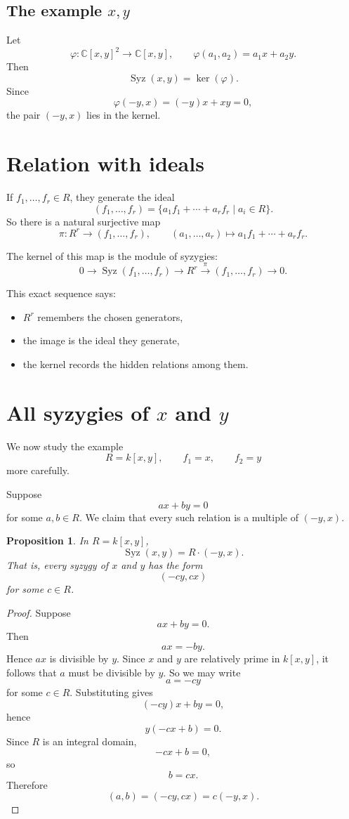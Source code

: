 \documentclass[11pt]{article}
\newtheorem{proposition}[theorem]{Proposition}
\theoremstyle{definition}
\theoremstyle{remark}
\newcommand{\C}{\mathbb{C}}
\newcommand{\Syz}{\operatorname{Syz}}
\newcommand{\kerR}{\operatorname{ker}}
\begin{document}
	\subsection{The example \(x,y\)}
	
	Let
	\[
	\varphi:\C[x,y]^2\to \C[x,y],
	\qquad
	\varphi(a_1,a_2)=a_1x+a_2y.
	\]
	Then
	\[
	\Syz(x,y)=\kerR(\varphi).
	\]
	Since
	\[
	\varphi(-y,x)=(-y)x+xy=0,
	\]
	the pair \((-y,x)\) lies in the kernel.
	
	\section{Relation with ideals}
	
	If \(f_1,\dots,f_r\in R\), they generate the ideal
	\[
	(f_1,\dots,f_r)
	=
	\{a_1f_1+\cdots+a_rf_r\mid a_i\in R\}.
	\]
	So there is a natural surjective map
	\[
	\pi:R^r\to (f_1,\dots,f_r),
	\qquad
	(a_1,\dots,a_r)\mapsto a_1f_1+\cdots+a_rf_r.
	\]
	
	The kernel of this map is the module of syzygies:
	\[
	0\to \Syz(f_1,\dots,f_r)\to R^r\xrightarrow{\pi}(f_1,\dots,f_r)\to 0.
	\]
	
	This exact sequence says:
	
	\begin{itemize}[leftmargin=2em]
		\item \(R^r\) remembers the chosen generators,
		\item the image is the ideal they generate,
		\item the kernel records the hidden relations among them.
	\end{itemize}
	
	\section{All syzygies of \(x\) and \(y\)}
	
	We now study the example
	\[
	R=k[x,y],\qquad f_1=x,\qquad f_2=y
	\]
	more carefully.
	
	Suppose
	\[
	ax+by=0
	\]
	for some \(a,b\in R\). We claim that every such relation is a multiple of \((-y,x)\).
	
	\begin{proposition}
		In \(R=k[x,y]\),
		\[
		\Syz(x,y)=R\cdot(-y,x).
		\]
		That is, every syzygy of \(x\) and \(y\) has the form
		\[
		(-cy,cx)
		\]
		for some \(c\in R\).
	\end{proposition}
	
	\begin{proof}
		Suppose
		\[
		ax+by=0.
		\]
		Then
		\[
		ax=-by.
		\]
		Hence \(ax\) is divisible by \(y\). Since \(x\) and \(y\) are relatively prime in \(k[x,y]\), it follows that \(a\) must be divisible by \(y\). So we may write
		\[
		a=-cy
		\]
		for some \(c\in R\). Substituting gives
		\[
		(-cy)x+by=0,
		\]
		hence
		\[
		y(-cx+b)=0.
		\]
		Since \(R\) is an integral domain,
		\[
		-cx+b=0,
		\]
		so
		\[
		b=cx.
		\]
		Therefore
		\[
		(a,b)=(-cy,cx)=c(-y,x).
		\]
	\end{proof}
	
\end{document}
